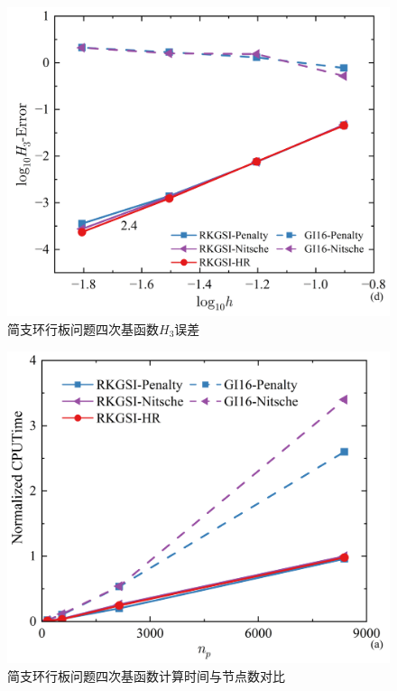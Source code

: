 \begin{figure}[H]
    \centering
    \includegraphics[scale=0.5]{figure/PHR/A/QH3.png}
    \caption{简支环行板问题四次基函数$H_3$误差}\label{AQLH2}
\end{figure}
\newpage
\begin{figure}[H]
    \centering
    \includegraphics[scale=0.5]{figure/PHR/A/Qcputime.png}
    \caption{简支环行板问题四次基函数计算时间与节点数对比}\label{AQcputime}
\end{figure}
